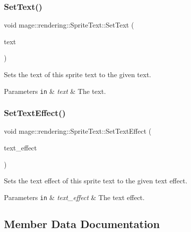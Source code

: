 \subsubsection{\texorpdfstring{Set\+Text()}{SetText()}}
{\footnotesize\ttfamily void mage\+::rendering\+::\+Sprite\+Text\+::\+Set\+Text (\begin{DoxyParamCaption}\item[{\mbox{\hyperlink{classmage_1_1rendering_1_1_color_string}{Color\+String}}}]{text }\end{DoxyParamCaption})}

Sets the text of this sprite text to the given text.


\begin{DoxyParams}[1]{Parameters}
\mbox{\tt in}  & {\em text} & The text. \\
\hline
\end{DoxyParams}
\mbox{\label{classmage_1_1rendering_1_1_sprite_text_a0870da91f8c11f63c09bf6de1bce4ce3}} 
\subsubsection{\texorpdfstring{Set\+Text\+Effect()}{SetTextEffect()}}
{\footnotesize\ttfamily void mage\+::rendering\+::\+Sprite\+Text\+::\+Set\+Text\+Effect (\begin{DoxyParamCaption}\item[{\mbox{\hyperlink{classmage_1_1rendering_1_1_sprite_text_af07ecf28d2ab8997c011cab74e799ef7}{Text\+Effect}}}]{text\+\_\+effect }\end{DoxyParamCaption})\hspace{0.3cm}{\ttfamily [noexcept]}}

Sets the text effect of this sprite text to the given text effect.


\begin{DoxyParams}[1]{Parameters}
\mbox{\tt in}  & {\em text\+\_\+effect} & The text effect. \\
\hline
\end{DoxyParams}


\subsection{Member Data Documentation}
\mbox{\label{classmage_1_1rendering_1_1_sprite_text_ad682901cbe866d2dc316bf3238812d25}} 
